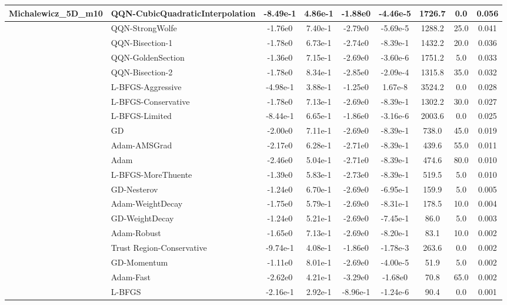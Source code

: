 \documentclass[10pt]{article}
\begin{document}
\begin{longtable}{|l|l|c|c|c|c|c|c|c|}
Michalewicz\_5D\_m10 & \textbf{QQN-CubicQuadraticInterpolation} & -8.49e-1 & 4.86e-1 & -1.88e0 & -4.46e-5 & 1726.7 & 0.0 & 0.056 \\
\hline
 & QQN-StrongWolfe & -1.76e0 & 7.40e-1 & -2.79e0 & -5.69e-5 & 1288.2 & 25.0 & 0.041 \\
\hline
 & QQN-Bisection-1 & -1.78e0 & 6.73e-1 & -2.74e0 & -8.39e-1 & 1432.2 & 20.0 & 0.036 \\
\hline
 & QQN-GoldenSection & -1.36e0 & 7.15e-1 & -2.69e0 & -3.60e-6 & 1751.2 & 5.0 & 0.033 \\
\hline
 & QQN-Bisection-2 & -1.78e0 & 8.34e-1 & -2.85e0 & -2.09e-4 & 1315.8 & 35.0 & 0.032 \\
\hline
 & L-BFGS-Aggressive & -4.98e-1 & 3.88e-1 & -1.25e0 & 1.67e-8 & 3524.2 & 0.0 & 0.028 \\
\hline
 & L-BFGS-Conservative & -1.78e0 & 7.13e-1 & -2.69e0 & -8.39e-1 & 1302.2 & 30.0 & 0.027 \\
\hline
 & L-BFGS-Limited & -8.44e-1 & 6.65e-1 & -1.86e0 & -3.16e-6 & 2003.6 & 0.0 & 0.025 \\
\hline
 & GD & -2.00e0 & 7.11e-1 & -2.69e0 & -8.39e-1 & 738.0 & 45.0 & 0.019 \\
\hline
 & Adam-AMSGrad & -2.17e0 & 6.28e-1 & -2.71e0 & -8.39e-1 & 439.6 & 55.0 & 0.011 \\
\hline
 & Adam & -2.46e0 & 5.04e-1 & -2.71e0 & -8.39e-1 & 474.6 & 80.0 & 0.010 \\
\hline
 & L-BFGS-MoreThuente & -1.39e0 & 5.83e-1 & -2.73e0 & -8.39e-1 & 519.5 & 5.0 & 0.010 \\
\hline
 & GD-Nesterov & -1.24e0 & 6.70e-1 & -2.69e0 & -6.95e-1 & 159.9 & 5.0 & 0.005 \\
\hline
 & Adam-WeightDecay & -1.75e0 & 5.79e-1 & -2.69e0 & -8.31e-1 & 178.5 & 10.0 & 0.004 \\
\hline
 & GD-WeightDecay & -1.24e0 & 5.21e-1 & -2.69e0 & -7.45e-1 & 86.0 & 5.0 & 0.003 \\
\hline
 & Adam-Robust & -1.65e0 & 7.13e-1 & -2.69e0 & -8.20e-1 & 83.1 & 10.0 & 0.002 \\
\hline
 & Trust Region-Conservative & -9.74e-1 & 4.08e-1 & -1.86e0 & -1.78e-3 & 263.6 & 0.0 & 0.002 \\
\hline
 & GD-Momentum & -1.11e0 & 8.01e-1 & -2.69e0 & -4.00e-5 & 51.9 & 5.0 & 0.002 \\
\hline
 & Adam-Fast & -2.62e0 & 4.21e-1 & -3.29e0 & -1.68e0 & 70.8 & 65.0 & 0.002 \\
\hline
 & L-BFGS & -2.16e-1 & 2.92e-1 & -8.96e-1 & -1.24e-6 & 90.4 & 0.0 & 0.001 \\

\end{longtable}
\end{document}
